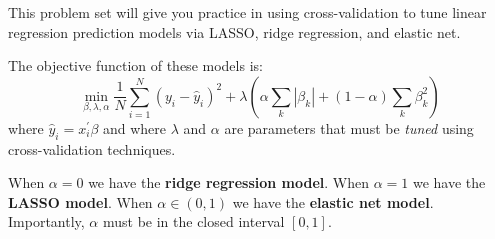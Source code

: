 \documentclass[12pt,english]{exam}
\begin{document}
This problem set will give you practice in using cross-validation to tune linear regression prediction models via LASSO, ridge regression, and elastic net.

The objective function of these models is:
\[
    \min_{\beta,\lambda,\alpha} \frac{1}{N}\sum_{i=1}^{N}\left(y_{i} - \hat{y}_{i}\right)^2 + \lambda\left(\alpha\sum_{k}\left| \beta_{k}\right| + \left(1-\alpha\right)\sum_{k}\beta_{k}^{2}\right)
\]
where $\hat{y}_{i} = x_{i}^{\prime}\beta$ and where $\lambda$ and $\alpha$ are parameters that must be \emph{tuned} using cross-validation techniques.

When $\alpha=0$ we have the \textbf{ridge regression model}. When $\alpha=1$ we have the \textbf{LASSO model}. When $\alpha\in\left(0,1\right)$ we have the \textbf{elastic net model}. Importantly, $\alpha$ must be in the closed interval $\left[0,1\right]$.
\end{document}
